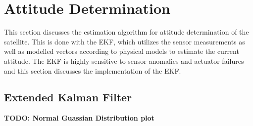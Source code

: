 \section{Attitude Determination}
This section discusses the estimation algorithm for attitude determination of the satellite. This is done with the EKF, which utilizes the sensor measurements as well as modelled vectors according to physical models to estimate the current attitude. The EKF is highly sensitive to sensor anomalies and actuator failures and this section discusses the implementation of the EKF.

\subsection{Extended Kalman Filter}

\textbf{TODO: Normal Guassian Distribution plot}

%	
%	
%	
%	
%	
%	

